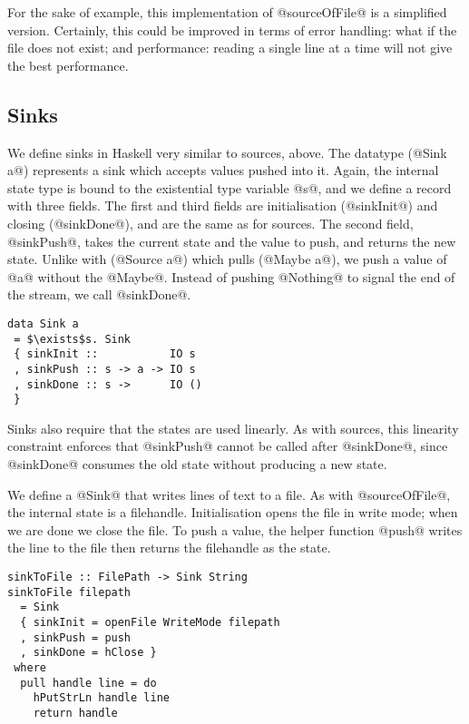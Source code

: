 For the sake of example, this implementation of @sourceOfFile@ is a simplified version.
Certainly, this could be improved in terms of error handling: what if the file does not exist; and performance: reading a single line at a time will not give the best performance.

\subsection{Sinks}

We define sinks in Haskell very similar to sources, above.
The datatype (@Sink a@) represents a sink which accepts values pushed into it.
Again, the internal state type is bound to the existential type variable @s@, and we define a record with three fields.
The first and third fields are initialisation (@sinkInit@) and closing (@sinkDone@), and are the same as for sources.
The second field, @sinkPush@, takes the current state and the value to push, and returns the new state.
Unlike with (@Source a@) which pulls (@Maybe a@), we push a value of @a@ without the @Maybe@.
Instead of pushing @Nothing@ to signal the end of the stream, we call @sinkDone@.

\begin{lstlisting}[mathescape=true]
data Sink a
 = $\exists$s. Sink
 { sinkInit ::           IO s
 , sinkPush :: s -> a -> IO s
 , sinkDone :: s ->      IO ()
 }
\end{lstlisting}

Sinks also require that the states are used linearly.
As with sources, this linearity constraint enforces that @sinkPush@ cannot be called after @sinkDone@, since @sinkDone@ consumes the old state without producing a new state.

We define a @Sink@ that writes lines of text to a file.
As with @sourceOfFile@, the internal state is a filehandle.
Initialisation opens the file in write mode; when we are done we close the file.
To push a value, the helper function @push@ writes the line to the file then returns the filehandle as the state.

\begin{lstlisting}
sinkToFile :: FilePath -> Sink String
sinkToFile filepath
  = Sink
  { sinkInit = openFile WriteMode filepath
  , sinkPush = push
  , sinkDone = hClose }
 where
  pull handle line = do
    hPutStrLn handle line
    return handle
\end{lstlisting}


